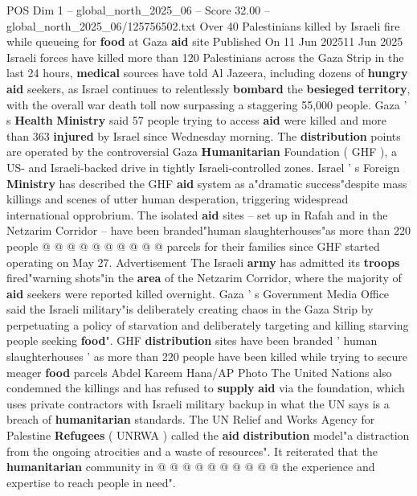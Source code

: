 \begin{textsample}{POS Dim 1 – global\_north\_2025\_06 – Score 32.00 – global\_north\_2025\_06/125756502.txt}  \label{ex:f1_pos_307}
Over 40 Palestinians killed by Israeli fire while queueing for \textbf{food} at Gaza \textbf{aid} site Published On 11 Jun 202511 Jun 2025 Israeli forces have killed more than 120 Palestinians across the Gaza Strip in the last 24 hours, \textbf{medical} sources have told Al Jazeera, including dozens of \textbf{hungry} \textbf{aid} seekers, as Israel continues to relentlessly \textbf{bombard} the \textbf{besieged} \textbf{territory}, with the overall war death toll now surpassing a staggering 55,000 people.
Gaza ' s \textbf{Health} \textbf{Ministry} said 57 people trying to access \textbf{aid} were killed and more than 363 \textbf{injured} by Israel since Wednesday morning.
The \textbf{distribution} points are operated by the controversial Gaza \textbf{Humanitarian} Foundation ( GHF ), a US- and Israeli-backed drive in tightly Israeli-controlled zones.
Israel ' s Foreign \textbf{Ministry} has described the GHF \textbf{aid} system as a"dramatic success"despite mass killings and scenes of utter human desperation, triggering widespread international opprobrium.
The isolated \textbf{aid} sites -- set up in Rafah and in the Netzarim Corridor -- have been branded"human slaughterhouses"as more than 220 people @ @ @ @ @ @ @ @ @ @ parcels for their families since GHF started operating on May 27.
Advertisement The Israeli \textbf{army} has admitted its \textbf{troops} fired"warning shots"in the \textbf{area} of the Netzarim Corridor, where the majority of \textbf{aid} seekers were reported killed overnight.
Gaza ' s Government Media Office said the Israeli military"is deliberately creating chaos in the Gaza Strip by perpetuating a policy of starvation and deliberately targeting and killing starving people seeking \textbf{food}".
GHF \textbf{distribution} sites have been branded ' human slaughterhouses ' as more than 220 people have been killed while trying to secure meager \textbf{food} parcels Abdel Kareem Hana/AP Photo The United Nations also condemned the killings and has refused to \textbf{supply} \textbf{aid} via the foundation, which uses private contractors with Israeli military backup in what the UN says is a breach of \textbf{humanitarian} standards.
The UN Relief and Works Agency for Palestine \textbf{Refugees} ( UNRWA ) called the \textbf{aid} \textbf{distribution} model"a distraction from the ongoing atrocities and a waste of resources".
It reiterated that the \textbf{humanitarian} community in @ @ @ @ @ @ @ @ @ @ the experience and expertise to reach people in need".

\end{textsample}
